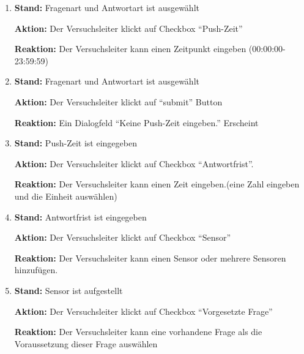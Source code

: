 \documentclass[a4paper]{scrreprt}
\begin{document}
\begin{itemize}
\begin{enumerate}
                        \item \par \textbf{Stand: } Fragenart und Antwortart ist ausgewählt
                              \par \textbf{Aktion: } Der Versuchsleiter klickt auf Checkbox ``Push-Zeit''
                              \par \textbf{Reaktion: } Der Versuchsleiter kann einen Zeitpunkt eingeben (00:00:00-23:59:59)

                        \item \par \textbf{Stand: } Fragenart und Antwortart ist ausgewählt
                              \par \textbf{Aktion: } Der Versuchsleiter klickt auf ``submit'' Button
                              \par \textbf{Reaktion: } Ein Dialogfeld ``Keine Push-Zeit eingeben.'' Erscheint

                        \item \par \textbf{Stand: } Push-Zeit ist eingegeben
                              \par \textbf{Aktion: } Der Versuchsleiter klickt auf Checkbox ``Antwortfrist''.
                              \par \textbf{Reaktion: } Der Versuchsleiter kann einen Zeit eingeben.(eine Zahl eingeben und die Einheit auswählen)


                        \item \par \textbf{Stand: } Antwortfrist ist eingegeben
                              \par \textbf{Aktion: } Der Versuchsleiter klickt auf Checkbox ``Sensor''
                              \par \textbf{Reaktion: } Der Versuchsleiter kann einen Sensor oder mehrere Sensoren hinzufügen.

                        \item \par \textbf{Stand: } Sensor ist aufgestellt
                              \par \textbf{Aktion: } Der Versuchsleiter klickt auf Checkbox ``Vorgesetzte Frage''
                              \par \textbf{Reaktion: } Der Versuchsleiter kann eine vorhandene Frage als die Voraussetzung dieser Frage auswählen



\end{enumerate}
\end{itemize}
\end{document}
